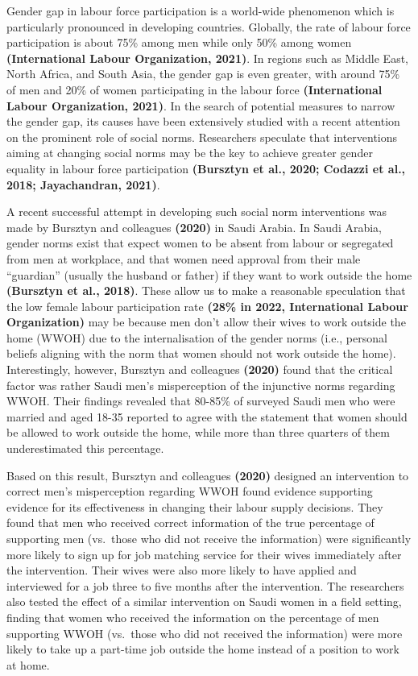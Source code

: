 \documentclass[
  11pt,
]{article}
\begin{document}
Gender gap in labour force participation is a world-wide phenomenon
which is particularly pronounced in developing countries. Globally, the
rate of labour force participation is about 75\% among men while only
50\% among women \textbf{(International Labour Organization, 2021)}. In
regions such as Middle East, North Africa, and South Asia, the gender
gap is even greater, with around 75\% of men and 20\% of women
participating in the labour force \textbf{(International Labour
Organization, 2021)}. In the search of potential measures to narrow the
gender gap, its causes have been extensively studied with a recent
attention on the prominent role of social norms. Researchers speculate
that interventions aiming at changing social norms may be the key to
achieve greater gender equality in labour force participation
\textbf{(Bursztyn et al., 2020; Codazzi et al., 2018; Jayachandran,
2021)}.

A recent successful attempt in developing such social norm interventions
was made by Bursztyn and colleagues \textbf{(2020)} in Saudi Arabia. In
Saudi Arabia, gender norms exist that expect women to be absent from
labour or segregated from men at workplace, and that women need approval
from their male ``guardian'' (usually the husband or father) if they
want to work outside the home \textbf{(Bursztyn et al., 2018)}. These
allow us to make a reasonable speculation that the low female labour
participation rate \textbf{(28\% in 2022, International Labour
Organization)} may be because men don't allow their wives to work
outside the home (WWOH) due to the internalisation of the gender norms
(i.e., personal beliefs aligning with the norm that women should not
work outside the home). Interestingly, however, Bursztyn and colleagues
\textbf{(2020)} found that the critical factor was rather Saudi men's
misperception of the injunctive norms regarding WWOH. Their findings
revealed that 80-85\% of surveyed Saudi men who were married and aged
18-35 reported to agree with the statement that women should be allowed
to work outside the home, while more than three quarters of them
underestimated this percentage.

Based on this result, Bursztyn and colleagues \textbf{(2020)} designed
an intervention to correct men's misperception regarding WWOH found
evidence supporting evidence for its effectiveness in changing their
labour supply decisions. They found that men who received correct
information of the true percentage of supporting men (vs.~those who did
not receive the information) were significantly more likely to sign up
for job matching service for their wives immediately after the
intervention. Their wives were also more likely to have applied and
interviewed for a job three to five months after the intervention. The
researchers also tested the effect of a similar intervention on Saudi
women in a field setting, finding that women who received the
information on the percentage of men supporting WWOH (vs.~those who did
not received the information) were more likely to take up a part-time
job outside the home instead of a position to work at home.
\end{document}
